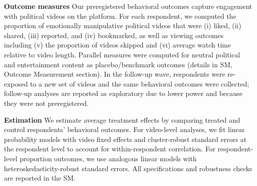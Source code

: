\documentclass[12pt]{article}
\begin{document}
\textbf{Outcome measures}
Our preregistered behavioral outcomes capture engagement with political videos on the platform. For each respondent, we computed the proportion of emotionally manipulative political videos that were (i) liked, (ii) shared, (iii) reported, and (iv) bookmarked, as well as viewing outcomes including (v) the proportion of videos skipped and (vi) average watch time relative to video length. Parallel measures were computed for neutral political and entertainment content as placebo/benchmark outcomes (details in SM, Outcome Measurement section). In the follow-up wave, respondents were re-exposed to a new set of videos and the same behavioral outcomes were collected; follow-up analyses are reported as exploratory due to lower power and because they were not preregistered.

\textbf{Estimation}
We estimate average treatment effects by comparing treated and control respondents’ behavioral outcomes. For video-level analyses, we fit linear probability models with video fixed effects and cluster-robust standard errors at the respondent level to account for within-respondent correlation. For respondent-level proportion outcomes, we use analogous linear models with heteroskedasticity-robust standard errors. All specifications and robustness checks are reported in the SM.





\end{document}
